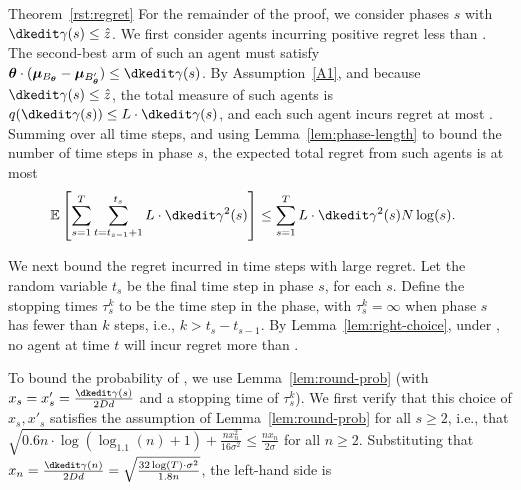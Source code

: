 \begin{emptyextraproof}{Theorem~\ref{rst:regret}}
For the remainder of the proof, we consider phases $s$
with $\EarlyCut{s} \leq \TieCutoff$.
We first consider agents \AgV incurring positive regret less than .
The second-best arm \Second{\AgV} of such an agent \AgV must satisfy
$\AgV \cdot (\ArmV{\Best{\AgV}} - \ArmV{\Second{\AgV}}) \leq \EarlyCut{s}$.
By Assumption~\ref{A1}, and because $\EarlyCut{s} \leq \TieCutoff$,
the total measure of such agents
is $\AlmostTied{\EarlyCut{s}} \leq \TieDensity \cdot \EarlyCut{s}$,
and each such agent incurs regret at most .
Summing over all time steps,
and using Lemma~\ref{lem:phase-length} to bound the number of time
steps in phase $s$, 
the expected total regret from such agents is at most
\begin{align}
\Expect{\sum_{s=1}^{T} \sum_{t=t_{s-1}+1}^{t_{s}} \TieDensity \cdot \EarlyCut[2]{s}}
& \leq \sum_{s=1}^{T} \TieDensity \cdot \EarlyCut[2]{s} \ARMNUM \log(s).
\label{equ:small_regret_bound}
\end{align}

We next bound the regret incurred in time steps with large regret.
Let the random variable $t_s$ be the final time step in phase $s$,
for each $s$.
Define the stopping times $\tau_{s}^{k}$ to be the 
time step in the  phase,
with $\tau_{s}^{k} = \infty$ when phase $s$ has fewer than $k$ steps,
i.e., $k > t_{s}-t_{s-1}$.
By Lemma~\ref{lem:right-choice},
under , no agent at time $t$ will incur
regret more than .
  
To bound the probability of ,
we use Lemma~\ref{lem:round-prob}
(with $x_s = x'_s = \frac{\EarlyCut{s}}{2 \Diam d}$
and a stopping time of $\tau_s^k$).
We first verify that this choice of $x_s, x'_s$
satisfies the assumption of Lemma~\ref{lem:round-prob} for all
$s \geq 2$,
i.e., that
$\sqrt{0.6 n \cdot \log (\log_{1.1}(n) + 1) + \frac{n x_n^2}{16 \sigma^2}}
\leq \frac{n x_n}{2 \sigma}$
for all $n \geq 2$.
Substituting that
$x_n = \frac{\EarlyCut{n}}{2 \Diam d} = \sqrt{\frac{32\log(T) \cdot \sigma^2}{1.8 n}}$,
the left-hand side is


\end{emptyextraproof}
